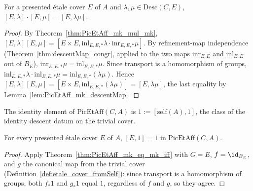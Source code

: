 \begin{theorem}
  \label{thm:PicEtAff_mk_mul_mk_same}
  \leanok
  For a presented \'etale cover \(E\) of \(A\) and \(\lambda, \mu \in \mathrm{Desc}(C,E)\),
  \([E,\lambda] \cdot [E,\mu] = [E, \lambda \mu]\).
\end{theorem}
\begin{proof}
  \leanok
  By Theorem~\ref{thm:PicEtAff_mk_mul_mk}, \([E,\lambda][E,\mu] = [E \times E,
  \mathrm{inl}_{E,E,*}\lambda \cdot \mathrm{inr}_{E,E,*}\mu]\). By refinement-map independence
  (Theorem~\ref{thm:descentMap_congr}, applied to the two maps \(\mathrm{inr}_{E,E}\) and
  \(\mathrm{inl}_{E,E}\) out of \(B_E\)), \(\mathrm{inr}_{E,E,*}\mu = \mathrm{inl}_{E,E,*}\mu\).
  Since transport is a homomorphism of groups,
  \(\mathrm{inl}_{E,E,*}\lambda \cdot \mathrm{inl}_{E,E,*}\mu = \mathrm{inl}_{E,E,*}(\lambda
  \mu)\). Hence \([E,\lambda][E,\mu] = [E \times E, \mathrm{inl}_{E,E,*}(\lambda\mu)] =
  [E,\lambda\mu]\), the last equality by Lemma~\ref{lem:PicEtAff_mk_descentMap}.
\end{proof}

\begin{definition}[Identity]
  \label{def:PicEtAff_one}
  \leanok
  The identity element of \(\mathrm{PicEtAff}(C,A)\) is \(1 := [\mathrm{self}(A), 1]\), the
  class of the identity descent datum on the trivial cover.
\end{definition}

\begin{theorem}
  \label{thm:PicEtAff_mk_one}
  \leanok
  For every presented \'etale cover \(E\) of \(A\), \([E,1] = 1\) in \(\mathrm{PicEtAff}(C,A)\).
\end{theorem}
\begin{proof}
  \leanok
  Apply Theorem~\ref{thm:PicEtAff_mk_eq_mk_iff} with \(G = E\), \(f = \id_{B_E}\), and \(g\)
  the canonical map from the trivial cover (Definition~\ref{def:etale_cover_fromSelf}): since
  transport is a homomorphism of groups, both \(f_{*}1\) and \(g_{*}1\) equal \(1\), regardless
  of \(f\) and \(g\), so they agree.
\end{proof}

